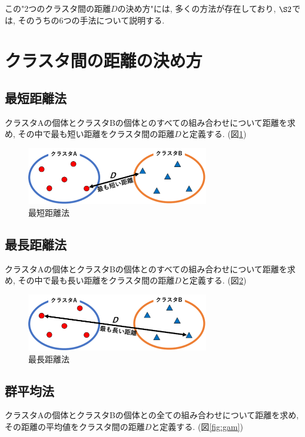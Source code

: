 \documentclass[a4paper,11pt,dvipdfmx]{jsarticle}
\begin{document}
この"2つのクラスタ間の距離$D$の決め方"には, 多くの方法が存在しており, $\S2$では, そのうちの6つの手法について説明する. 

\section{クラスタ間の距離の決め方}
\label{sec:how_to_decide}

\subsection*{最短距離法}
クラスタAの個体とクラスタBの個体とのすべての組み合わせについて距離を求め, 
その中で最も短い距離をクラスタ間の距離$D$と定義する. (図\ref{fig:sdm})

\begin{figure}[htb]
  \centering
  \includegraphics[width=8cm]{../pics/SDM.png}
  \caption{最短距離法}
  \label{fig:sdm}
\end{figure}

\subsection*{最長距離法}
クラスタAの個体とクラスタBの個体とのすべての組み合わせについて距離を求め, 
その中で最も長い距離をクラスタ間の距離$D$と定義する. (図\ref{fig:ldm})

\begin{figure}[htb]
  \centering
  \includegraphics[width=8cm]{../pics/LDM.png}
  \caption{最長距離法}
  \label{fig:ldm}
\end{figure}

\subsection*{群平均法}
クラスタAの個体とクラスタBの個体との全ての組み合わせについて距離を求め, 
その距離の平均値をクラスタ間の距離$D$と定義する. (図\ref{fig:gam})
\end{document}
